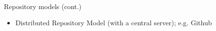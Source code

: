 \begin{frame}{Repository models (cont.)}

\begin{itemize}
\item Distributed Repository Model (with a central server); e.g. Github
\end{itemize}
\begin{center}
    \resizebox{!}{0.7\textheight}{
        
    }
\end{center}

\end{frame}

